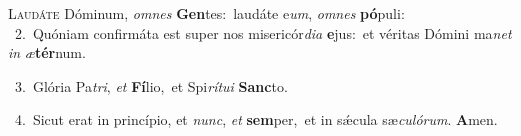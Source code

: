 \lettrine{\initial\textcolor{\initialcolor}{L}}{audáte} Dóminum, \textit{om}\-\textit{nes} \textbf{Gen}\-tes:~\star laudáte e\-\textit{um}\-, \textit{om}\-\textit{nes} \textbf{pó}\-puli:\\
{\numbfont\textcolor{\numbcolor}{~2.}}~Quóniam confirmáta est super nos misericór\-\textit{di}\-\textit{a} \textbf{e}\-jus:~\star et véritas Dómini ma\textit{net} \textit{in} \textit{æ}\-\textbf{tér}num.\par
{\numbfont\textcolor{\numbcolor}{~3.}}~Glória Pa\-\textit{tri}\-, \textit{et} \textbf{Fí}\-lio,~\star et Spi\-\textit{rí}\-\textit{tu}\textit{i} \textbf{Sanc}\-to.\par
{\numbfont\textcolor{\numbcolor}{~4.}}~Sicut erat in princípio, et \textit{nunc}\-, \textit{et} \textbf{sem}\-per,~\star et in sǽcula sæ\-\textit{cu}\-\textit{ló}\textit{rum}. \textbf{A}\-men.\par
